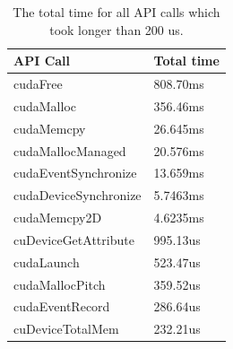 \documentclass{article}
\begin{document}
\begin{table}[]
  \centering
  \begin{tabular}{|l|l|}
    \hline
    API Call                & Total time \\ \hline
    cudaFree                & 808.70ms   \\ \hline
    cudaMalloc              & 356.46ms   \\ \hline
    cudaMemcpy              & 26.645ms   \\ \hline
    cudaMallocManaged       & 20.576ms   \\ \hline
    cudaEventSynchronize    & 13.659ms   \\ \hline
    cudaDeviceSynchronize   & 5.7463ms   \\ \hline
    cudaMemcpy2D            & 4.6235ms   \\ \hline
    cuDeviceGetAttribute    & 995.13us   \\ \hline
    cudaLaunch              & 523.47us   \\ \hline
    cudaMallocPitch         & 359.52us   \\ \hline
    cudaEventRecord         & 286.64us   \\ \hline
    cuDeviceTotalMem        & 232.21us   \\ \hline
  \end{tabular}
  \caption{The total time for all API calls which took longer than 200 us.}
\end{table}
\end{document}
